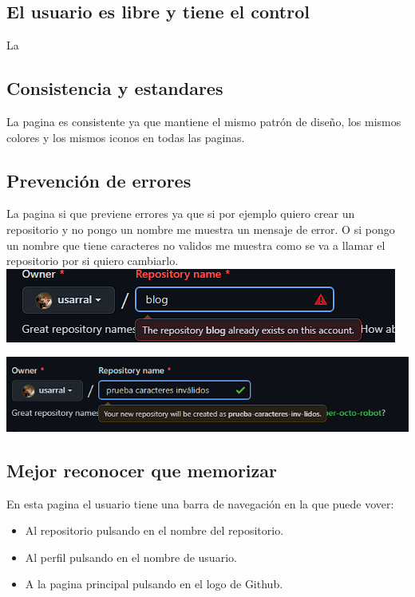 \documentclass[a4paper,12pt]{article} %
\begin{document}
\subsection{El usuario es libre y tiene el control}

La 
\subsection{Consistencia y estandares}

La pagina es consistente ya que mantiene el mismo patrón de diseño, los mismos colores y los mismos iconos en todas las paginas.

\subsection{Prevención de errores}

La pagina si que previene errores ya que si por ejemplo quiero crear un repositorio y no pongo un nombre me muestra un mensaje de error. O si pongo un nombre que tiene caracteres no validos me muestra como se va a llamar el repositorio por si quiero cambiarlo.
\includegraphics{02.png}

\includegraphics{03.png}

\subsection{Mejor reconocer que memorizar}
En esta pagina el usuario tiene una barra de navegación en la que puede vover:
\begin{itemize}
    \item Al repositorio pulsando en el nombre del repositorio.
    \item Al perfil pulsando en el nombre de usuario.
    \item A la pagina principal pulsando en el logo de Github.
\end{itemize}
\end{document}
